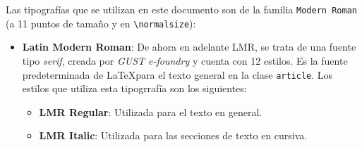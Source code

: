\documentclass[../ei103948-project-documentation.tex]{subfiles}
\begin{document}
                            Las tipografías que se utilizan en este documento son de la familia \texttt{Modern Roman} (a 11 puntos de tamaño y en \texttt{\textbackslash normalsize}):
                                \begin{itemize}
                                    \item \textbf{Latin Modern Roman}: De ahora en adelante LMR, se trata de una fuente tipo \textit{serif}, creada por \textit{GUST e-foundry} y cuenta con 12 estilos. Es la fuente predeterminada de \LaTeX para el texto general en la clase \texttt{article}. Los estilos que utiliza esta tipogrrafía son los siguientes:
                                        \begin{itemize}
                                            \item \textbf{LMR Regular}: Utilizada para el texto en general.
                                            \begin{figure}[H]
                                                \begin{center}
                                                \end{center}
                                            \end{figure}
                    
                                            \item \textbf{LMR Italic}: Utilizada para las secciones de texto en cursiva.
                                            \begin{figure}[H]
                                                \begin{center}
                                                \end{center}
                                            \end{figure}


\end{itemize}
\end{itemize}
\end{document}
